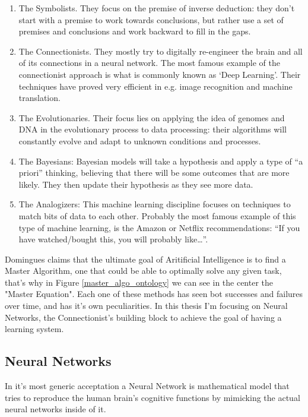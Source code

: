 \documentclass[11pt,a4paper,titlepage]{book}
\begin{document}
\begin{enumerate}
    \item The Symbolists. They focus on the premise of inverse deduction: they don’t start with a premise to work towards conclusions, but rather use a set of premises and conclusions and work backward to fill in the gaps.
    \item The Connectionists. They mostly try to digitally re-engineer the brain and all of its connections in a neural network. The most famous example of the connectionist approach is what is commonly known as ‘Deep Learning’. Their techniques have proved very efficient in e.g. image recognition and machine translation.
    \item The Evolutionaries. Their focus lies on applying the idea of genomes and DNA in the evolutionary process to data processing: their algorithms will constantly evolve and adapt to unknown conditions and processes.
    \item The Bayesians: Bayesian models will take a hypothesis and apply a type of “a priori” thinking, believing that there will be some outcomes that are more likely. They then update their hypothesis as they see more data.
    \item The Analogizers: This machine learning discipline focuses on techniques to match bits of data to each other. Probably the most famous example of this type of machine learning, is the Amazon or Netflix recommendations: “If you have watched/bought this, you will probably like…”.
\end{enumerate}
Domingues claims that the ultimate goal of Aritificial Intelligence is to find a Master Algorithm, one that could be able to optimally solve any given task, that's why in Figure \ref{master_algo_ontology} we can see in the center the "Master Equation". 
\newline
\newline
Each one of these methods has seen bot successes and failures over time, and has it's own peculiarities. In this thesis I'm focusing on Neural Networks, the Connectionist's building block to achieve the goal of having a learning system.

\subsection{Neural Networks}
In it's most generic acceptation a Neural Network is mathematical model that tries to reproduce the human brain's cognitive functions by mimicking the actual neural networks inside of it.
\end{document}
